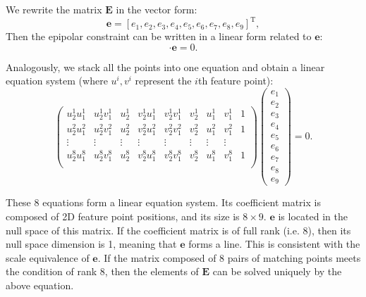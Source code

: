 We rewrite the matrix $\bm{E}$ in the vector form:
\[
\bm{e}= [e_{1},e_{2},e_{3},e_{4},e_{5},e_{6},e_{7},e_{8},e_{9}]^{\mathrm{T}},
\]
Then the epipolar constraint can be written in a linear form related to $\bm{e}$:
\begin{equation}
[u_{2}u_{1},u_{2}v_{1},u_{2},v_{2}u_{1},v_{2}v_{1},v_{2},u_{1},v_{1},1] \cdot  \bm{e}=0.
\end{equation}

Analogously, we stack all the points into one equation and obtain a linear equation system (where $u^i, v^i$ represent the $i$th feature point): 
\begin{equation}
\label{Eq:eight-point}
\begin{pmatrix}
u_{2}^{1}u_{1}^{1}& u_{2}^{1}v_{1}^{1}& u_{2}^{1}& v_{2}^{1}u_{1}^{1}& v_{2}^{1}v_{1}^{1}& v_{2}^{1} &u_{1}^{1} &v_{1}^{1}&1\\
u_{2}^{2}u_{1}^{2}& u_{2}^{2}v_{1}^{2}& u_{2}^{2}& v_{2}^{2}u_{1}^{2}& v_{2}^{2}v_{1}^{2}& v_{2}^{2} &u_{1}^{2} &v_{1}^{2}&1\\
\vdots & \vdots & \vdots & \vdots & \vdots & \vdots & \vdots & \vdots \\
u_{2}^{8}u_{1}^{8}& u_{2}^{8}v_{1}^{8}& u_{2}^{8}& v_{2}^{8}u_{1}^{8}& v_{2}^{8}v_{1}^{8}& v_{2}^{8} &u_{1}^{8}&v_{1}^{8}&1\\
\end{pmatrix}
\begin{pmatrix}
e_{1}\\ e_{2}\\ e_{3}\\  e_{4}\\ e_{5}\\ e_{6}\\ e_{7}\\ e_{8}\\ e_{9}  
\end{pmatrix}
=0.
\end{equation}

These 8 equations form a linear equation system. Its coefficient matrix is composed of 2D feature point positions, and its size is $8 \times 9$. $\bm{e}$ is located in the null space of this matrix. If the coefficient matrix is of full rank (i.e. 8), then its null space dimension is 1, meaning that $\bm{e}$ forms a line. This is consistent with the scale equivalence of $\bm{e}$. If the matrix composed of 8 pairs of matching points meets the condition of rank 8, then the elements of $\bm{E}$ can be solved uniquely by the above equation.

